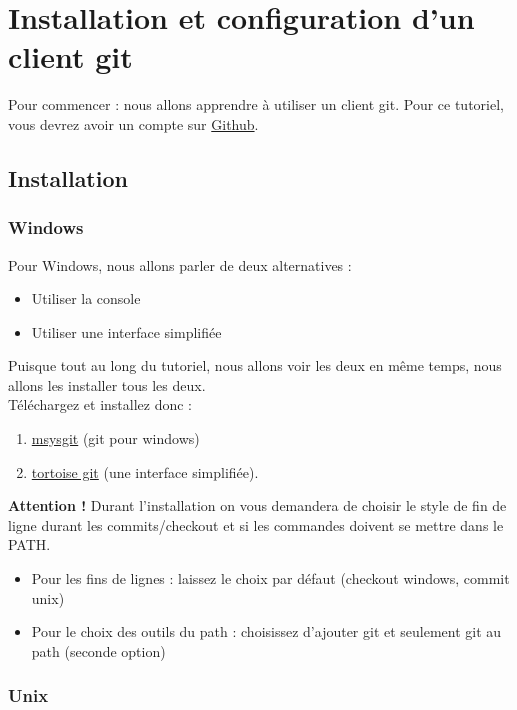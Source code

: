 \chapter{Installation et configuration d'un client git}
Pour commencer : nous allons apprendre à utiliser un client git.
Pour ce tutoriel, vous devrez avoir un compte sur \href{https://github.com/}{Github}.

\section{Installation}
\subsection{Windows}

Pour Windows, nous allons parler de deux alternatives :

\begin{itemize}
	\item Utiliser la console
	\item Utiliser une interface simplifiée\\
\end{itemize}


Puisque tout au long du tutoriel, nous allons voir les deux en même temps, nous allons les installer tous les deux.\\

Téléchargez et installez donc :
\begin{enumerate}
	\item \href{http://msysgit.github.io/}{msysgit} (git pour windows)
	\item \href{http://code.google.com/p/tortoisegit/wiki/Download}{tortoise git} (une interface simplifiée).\\
\end{enumerate}

\textbf{Attention !}
Durant l'installation on vous demandera de choisir le style de fin de ligne durant les commits/checkout et si les commandes doivent se mettre dans le PATH.\\

\begin{itemize}
	\item Pour les fins de lignes : laissez le choix par défaut (checkout windows, commit unix)
	\item Pour le choix des outils du path : choisissez d'ajouter git et seulement git au path (seconde option)
\end{itemize}
\newpage
\subsection{Unix}

